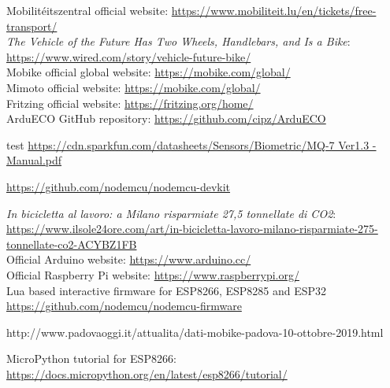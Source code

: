 \begin{thebibliography}{00}
	
	
 Mobilitéitszentral official website:  \url{https://www.mobiliteit.lu/en/tickets/free-transport/}\\
 \textit{The Vehicle of the Future Has Two Wheels, Handlebars, and Is a Bike}:  \url{https://www.wired.com/story/vehicle-future-bike/}\\
 Mobike official global website: \url{https://mobike.com/global/}\\
 Mimoto official website: \url{https://mobike.com/global/}\\

 Fritzing official website: \href{https://fritzing.org/home/}{https://fritzing.org/home/}\\

 ArduECO GitHub repository:  \href{https://github.com/cipz/ArduECO}{https://github.com/cipz/ArduECO}

 test \href{https://cdn.sparkfun.com/datasheets/Sensors/Biometric/MQ-7 Ver1.3 - Manual.pdf}{https://cdn.sparkfun.com/datasheets/Sensors/Biometric/MQ-7 Ver1.3 - Manual.pdf}

 \href{https://github.com/nodemcu/nodemcu-devkit}{https://github.com/nodemcu/nodemcu-devkit}




 \textit{In bicicletta al lavoro: a Milano risparmiate 27,5 tonnellate di CO2}:  \url{https://www.ilsole24ore.com/art/in-bicicletta-lavoro-milano-risparmiate-275-tonnellate-co2-ACYBZ1FB}\\

 Official Arduino website: \url{https://www.arduino.cc/}\\

 Official Raspberry Pi website: \url{https://www.raspberrypi.org/}\\
	
 Lua based interactive firmware for ESP8266, ESP8285 and ESP32 \url{https://github.com/nodemcu/nodemcu-firmware}

http://www.padovaoggi.it/attualita/dati-mobike-padova-10-ottobre-2019.html

 MicroPython tutorial for ESP8266: \url{https://docs.micropython.org/en/latest/esp8266/tutorial/}


\end{thebibliography}
